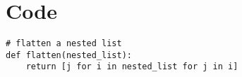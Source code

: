 
\chapter{Code}\label{app:A}

\begin{lstlisting}
# flatten a nested list
def flatten(nested_list):
	return [j for i in nested_list for j in i]

\end{lstlisting} 